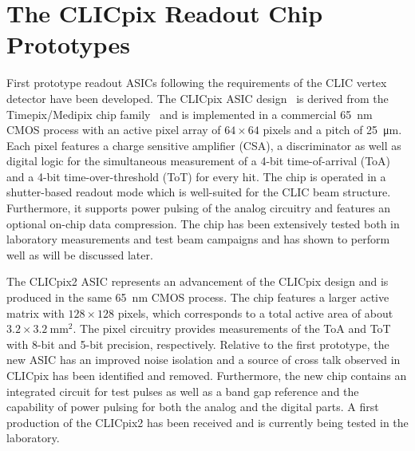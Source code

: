 \documentclass[a4paper,11pt]{article}
\begin{document}
\section{The CLICpix Readout Chip Prototypes}
\label{sec:clicpix}

First prototype readout ASICs following the requirements of the CLIC vertex detector have been developed.
The CLICpix ASIC design~\cite{clicpix} is derived from the Timepix/Medipix chip family~\cite{timepix,timepix3,medipix} and is implemented in a commercial \SI{65}{\nm} CMOS process with an active pixel array of $64\times 64$ pixels and a pitch of \SI{25}{\um}.
Each pixel features a charge sensitive amplifier (CSA), a discriminator as well as digital logic for the simultaneous measurement of a 4-bit time-of-arrival (ToA) and a 4-bit time-over-threshold (ToT) for every hit.
The chip is operated in a shutter-based readout mode which is well-suited for the CLIC beam structure.
Furthermore, it supports power pulsing of the analog circuitry and features an optional on-chip data compression.
The chip has been extensively tested both in laboratory measurements and test beam campaigns and has shown to perform well as will be discussed later.


The CLICpix2 ASIC represents an advancement of the CLICpix design and is produced in the same \SI{65}{\nm} CMOS process. %
The chip features a larger active matrix with $128 \times 128$ pixels, which corresponds to a total active area of about $3.2\times\SI{3.2}{\square \mm}$.
The pixel circuitry provides measurements of the ToA and ToT with 8-bit and 5-bit precision, respectively.
Relative to the first prototype, the new ASIC has an improved noise isolation and a source of cross talk observed in CLICpix has been identified and removed.
Furthermore, the new chip contains an integrated circuit for test pulses as well as a band gap reference and the capability of power pulsing for both the analog and the digital parts.
A first production of the CLICpix2 has been received and is currently being tested in the laboratory. 
\end{document}
